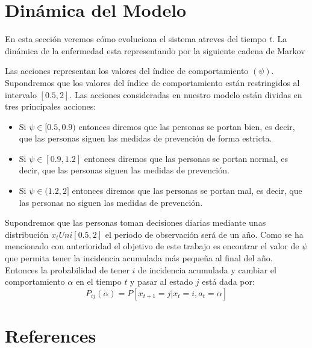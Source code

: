 \documentclass[
  letterpaper,
  DIV=11,
  numbers=noendperiod]{scrreprt}
\newlength{\cslhangindent}
\newenvironment{CSLReferences}[2] %
 {\begin{list}{}{%
  \setlength{\itemindent}{0pt}
  \setlength{\leftmargin}{0pt}
  \setlength{\parsep}{0pt}
  \ifodd #1
   \setlength{\leftmargin}{\cslhangindent}
   \setlength{\itemindent}{-1\cslhangindent}
  \fi
  \setlength{\itemsep}{#2\baselineskip}}}
 {\end{list}}
\begin{document}

\chapter{Dinámica del Modelo}\label{dinuxe1mica-del-modelo}

En esta sección veremos cómo evoluciona el sistema atreves del tiempo
\(t\). La dinámica de la enfermedad esta representando por la siguiente
cadena de Markov

Las acciones representan los valores del índice de comportamiento
\((\psi)\). Supondremos que los valores del índice de comportamiento
están restringidos al intervalo \([0.5,2]\). Las acciones consideradas
en nuestro modelo están dividas en tres principales acciones:

\begin{itemize}
\item
  Si \(\psi\in [0.5,0.9)\) entonces diremos que las personas se portan
  bien, es decir, que las personas siguen las medidas de prevención de
  forma estricta.
\item
  Si \(\psi\in [0.9,1.2]\) entonces diremos que las personas se portan
  normal, es decir, que las personas siguen las medidas de prevención.
\item
  Si \(\psi\in (1.2,2]\) entonces diremos que las personas se portan
  mal, es decir, que las personas no siguen las medidas de prevención.
\end{itemize}

Supondremos que las personas toman decisiones diarias mediante unas
distribución \(x_{t} Uni[0.5,2]\) el periodo de observación será de un
año. Como se ha mencionado con anterioridad el objetivo de este trabajo
es encontrar el valor de \(\psi\) que permita tener la incidencia
acumulada más pequeña al final del año. Entonces la probabilidad de
tener \(i\) de incidencia acumulada y cambiar el comportamiento
\(\alpha\) en el tiempo \(t\) y pasar al estado \(j\) está dada por:
\[P_{ij}(\alpha)=P[x_{t+1}=j|x_{t}=i,a_{t}=\alpha]\]


\chapter*{References}\label{references}


\label{refs}
\begin{CSLReferences}{0}{1}
\end{CSLReferences}
\end{document}
